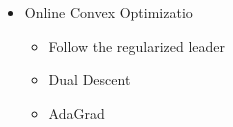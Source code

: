 \documentclass[handout]{beamer}
\begin{document}
\begin{small}
\begin{frame}
\begin{columns}
\begin{column}[t]{4cm}
\begin{itemize}
    \item Online Convex Optimizatio
      \begin{itemize}
      \item Follow the regularized leader
      \item Dual Descent
      \item AdaGrad
      \end{itemize}
    \end{itemize}
  \end{column}
\end{columns}
\iffalse
    1.Introduction			15.Specialists			7.Bregman			Untitled.ipynb
10.DualDescent			2.Hedge				8.tracking			XX.OCO
11.DriftingGames		3.UniversalCodingBayes		9.trackingASmallSetOfExpert	macros.tex
12.RepeatedMatrix		4.ContinExperts			HW				plan.md
13.InternalRegret		5.ContextAlg					texput.log
14.MultipleArmBandit		6.mixable		
\fi
  \end{frame}
\end{small}
\end{document}
